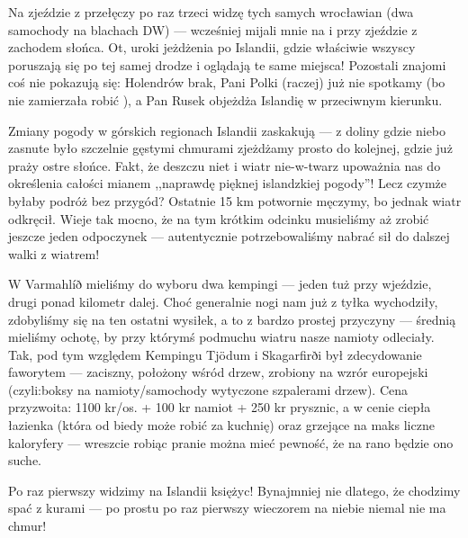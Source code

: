 Na zjeździe z przełęczy po raz trzeci widzę tych samych wrocławian (dwa samochody na blachach DW) --- wcześniej mijali mnie na  i przy zjeździe z zachodem słońca. Ot, uroki jeżdżenia po Islandii, gdzie właściwie wszyscy poruszają się po tej samej drodze i oglądają te same miejsca! Pozostali znajomi coś nie pokazują się: Holendrów brak, Pani Polki (raczej) już nie spotkamy (bo nie zamierzała robić ), a Pan Rusek objeżdża Islandię w przeciwnym kierunku.

Zmiany pogody w górskich regionach Islandii zaskakują --- z doliny gdzie niebo zasnute było szczelnie gęstymi chmurami zjeżdżamy prosto do kolejnej, gdzie już praży ostre słońce. Fakt, że deszczu niet i wiatr nie-w-twarz upoważnia nas do określenia całości mianem ,,naprawdę pięknej islandzkiej pogody''! Lecz czymże byłaby podróż bez przygód? Ostatnie 15 km potwornie męczymy, bo jednak wiatr odkręcił. Wieje tak mocno, że na tym krótkim odcinku musieliśmy aż zrobić jeszcze jeden odpoczynek --- autentycznie potrzebowaliśmy nabrać sił do dalszej walki z wiatrem!

W Varmahlíð mieliśmy do wyboru dwa kempingi --- jeden tuż przy wjeździe, drugi ponad kilometr dalej. Choć generalnie nogi nam już z tyłka wychodziły, zdobyliśmy się na ten ostatni wysiłek, a to z bardzo prostej przyczyny --- średnią mieliśmy ochotę, by przy którymś podmuchu wiatru nasze namioty odleciały. Tak, pod tym względem Kempingu Tjödum i Skagarfirði był zdecydowanie faworytem --- zaciszny, położony wśród drzew, zrobiony na wzrór europejski (czyli:boksy na namioty/samochody wytyczone szpalerami drzew). Cena przyzwoita: 1100 kr/os. + 100 kr namiot + 250 kr prysznic, a w cenie ciepła łazienka (która od biedy może robić za kuchnię) oraz grzejące na maks liczne kaloryfery --- wreszcie robiąc pranie można mieć pewność, że na rano będzie ono suche.

Po raz pierwszy widzimy na Islandii księżyc! Bynajmniej nie dlatego, że chodzimy spać z kurami --- po prostu po raz pierwszy wieczorem na niebie niemal nie ma chmur!
